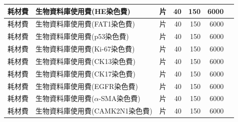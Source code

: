 \documentclass[12pt, a4paper]{article}
\begin{document}
\begin{CJK*}{UTF8}{bkai}
\begin{table}[hp]
{\begin{tabular}{|c|l|c|r|r|r|r|}
耗材費    & 生物資料庫使用費(HE染色費)           & 片  & 40                      & 150                      & 6000                    &                                                                      \\ \hline


耗材費    & 生物資料庫使用費(FAT1染色費)           & 片  & 40                      & 150                      & 6000                    &                                                                      \\ \hline

耗材費    & 生物資料庫使用費(p53染色費)           & 片  & 40                      & 150                      & 6000                    &                                                                      \\ \hline

耗材費    & 生物資料庫使用費(Ki-67染色費)           & 片  & 40                      & 150                      & 6000                    &                                                                      \\ \hline

耗材費    & 生物資料庫使用費(CK13染色費)           & 片  & 40                      & 150                      & 6000                    &                                                                      \\ \hline

耗材費    & 生物資料庫使用費(CK17染色費)           & 片  & 40                      & 150                      & 6000                    &                                                                      \\ \hline

耗材費    & 生物資料庫使用費(EGFR染色費)           & 片  & 40                      & 150                      & 6000                    &                                                                      \\ \hline

耗材費    & 生物資料庫使用費($\alpha$-SMA染色費)           & 片  & 40                      & 150                      & 6000                    &                                                                      \\ \hline

耗材費    & 生物資料庫使用費(CAMK2N1染色費)           & 片  & 40                      & 150                      & 6000                    &                                                                      \\ \hline


\end{tabular}}
\end{table}
\end{CJK*}
\end{document}
